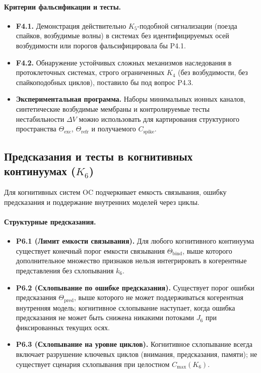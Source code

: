 \paragraph{Критерии фальсификации и тесты.}
\begin{itemize}
  \item \textbf{F4.1.}
        Демонстрация действительно \(K_5\)-подобной сигнализации (поезда
        спайков, возбудимые волны) в системах без идентифицируемых осей
        возбудимости или порогов фальсифицировала бы P4.1.
  \item \textbf{F4.2.}
        Обнаружение устойчивых сложных механизмов наследования в
        протоклеточных системах, строго ограниченных \(K_4\) (без
        возбудимости, без спайкоподобных циклов), поставило бы под
        вопрос P4.3.
  \item \textbf{Экспериментальная программа.}
        Наборы минимальных ионных каналов, синтетические возбудимые мембраны
        и контролируемые тесты нестабильности \(\Delta V\) можно использовать
        для картирования структурного пространства
        \(\Theta_{\mathrm{exc}}\), \(\Theta_{\mathrm{refr}}\) и получаемого
        \(C_{\mathrm{spike}}\).
\end{itemize}

\subsection{Предсказания и тесты в когнитивных континуумах
            (\texorpdfstring{$K_6$}{K\_6})}

Для когнитивных систем OC подчеркивает емкость связывания, ошибку предсказания
и поддержание внутренних моделей через циклы.

\paragraph{Структурные предсказания.}
\begin{itemize}
  \item \textbf{P6.1 (Лимит емкости связывания).}
        Для любого когнитивного континуума существует конечный порог емкости
        связывания \(\Theta_{\mathrm{bind}}\), выше которого дополнительное
        множество признаков нельзя интегрировать в когерентные представления
        без схлопывания \(k_6\).
  \item \textbf{P6.2 (Схлопывание по ошибке предсказания).}
        Существует порог ошибки предсказания \(\Theta_{\mathrm{pred}}\), выше
        которого не может поддерживаться когерентная внутренняя модель; когнитивное
        схлопывание наступает, когда ошибка предсказания не может быть
        снижена никакими потоками \(J_6\) при фиксированных текущих осях.
  \item \textbf{P6.3 (Схлопывание на уровне циклов).}
        Когнитивное схлопывание всегда включает разрушение ключевых циклов
        (внимания, предсказания, памяти); не существует сценария
        схлопывания при целостном \(C_{\max}(K_6)\).
\end{itemize}

